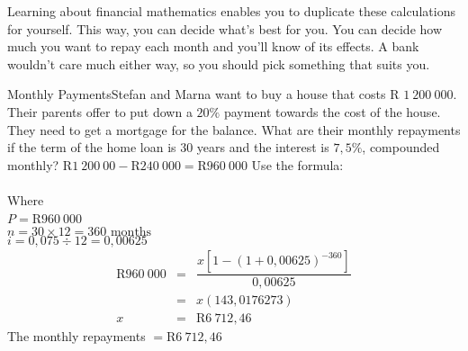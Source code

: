 Learning about financial mathematics enables you to duplicate these calculations for yourself. This way, you can decide what's best for you. You can decide how much you want to repay each month and you'll know of its effects. A bank wouldn't care much either way, so you should pick something that suits you.

\begin{wex}{Monthly Payments}{Stefan and Marna want to buy a house that costs R $1~200~000$. Their parents offer to put down a $20\%$ payment towards the cost of the house.  They need to get a mortgage for the balance.  What are their monthly repayments if the term of the home loan is 30 years and the interest is $7,5\%$, compounded monthly?}
{
R$ 1~200~00 - $R$ 240~000 = $R$ 960~000$
Use the formula: \\
\\
Where \\
$P = $R$960~000$\\
$n = 30 \times 12 = 360 \mbox{ months}$\\
$i = 0,075 \div 12 = 0,00625$
\begin{eqnarray*}
\mbox{R}960~000&=& \dfrac{x[1-(1 + 0,00625)^{-360}]}{0,00625}\\
&=&x(143,0176273)\\
x&=&\mbox{R} 6~712,46
\end{eqnarray*}
The monthly repayments $= $R$6~712,46$
}
\end{wex}


